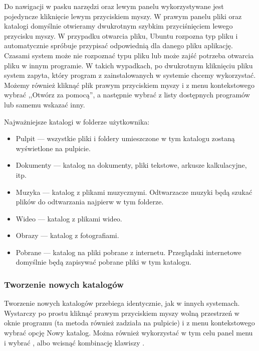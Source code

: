 Do nawigacji w pasku narzędzi oraz lewym panelu wykorzystywane jest pojedyncze kliknięcie lewym przyciskiem myszy. W prawym panelu pliki oraz katalogi domyślnie otwieramy dwukrotnym szybkim przyciśnięciem lewego przycisku myszy. W przypadku otwarcia pliku, Ubuntu rozpozna typ pliku i automatycznie spróbuje przypisać odpowiednią dla danego pliku aplikację. Czasami system może nie rozpoznać typu pliku lub może zajść potrzeba otwarcia pliku w innym programie. W takich wypadkach, po dwukrotnym kliknięciu pliku system zapyta, który program z zainstalowanych w systemie chcemy wykorzystać. Możemy również kliknąć plik prawym przyciskiem myszy i z menu kontekstowego wybrać ,,Otwórz za pomocą'', a następnie wybrać z listy dostępnych programów lub samemu wskazać inny.

Najważniejsze katalogi w folderze użytkownika:
\begin{itemize}
\item \textcolor{ubuntu_orange}{Pulpit} --- wszystkie pliki i foldery umieszczone w tym katalogu zostaną wyświetlone na pulpicie.
\item \textcolor{ubuntu_orange}{Dokumenty} --- katalog na dokumenty, pliki tekstowe, arkusze kalkulacyjne, itp.
\item \textcolor{ubuntu_orange}{Muzyka} --- katalog z plikami muzycznymi. Odtwarzacze muzyki będą szukać plików do odtwarzania najpierw w tym folderze.
\item \textcolor{ubuntu_orange}{Wideo} --- katalog z plikami wideo.
\item \textcolor{ubuntu_orange}{Obrazy} --- katalog z fotografiami.
\item \textcolor{ubuntu_orange}{Pobrane} --- katalog na pliki pobrane z internetu. Przeglądaki internetowe domyślnie będą zapisywać pobrane pliki w tym katalogu.
\end{itemize}

\subsubsection{Tworzenie nowych katalogów}
Tworzenie nowych katalogów przebiega identycznie, jak w innych systemach. Wystarczy po prostu kliknąć prawym przyciskiem myszy wolną przestrzeń w oknie programu (ta metoda również zadziała na pulpicie) i z menu kontekstowego wybrać opcję \textcolor{ubuntu_orange}{Nowy katalog}. Można również wykorzystać w tym celu panel menu i wybrać , albo wcisnąć kombinację klawiszy .

